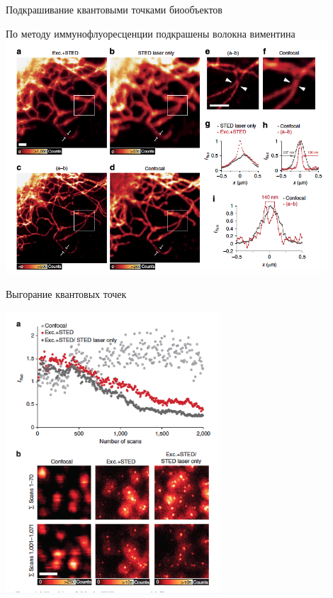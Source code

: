 \documentclass[9pt, compress, xcolor=table]{beamer}
\begin{document}
\begin{frame}{Подкрашивание квантовыми точками биообъектов}
\begin{center}

По методу иммунофлуоресценции подкрашены волокна виментина
\includegraphics[width=0.9\textwidth]{ffm25}
\end{center}
\end{frame}


\begin{frame}{Выгорание квантовых точек}
\begin{center}
\includegraphics[width=0.6\textwidth]{ffm26}
\end{center}
\end{frame}
\end{document}
